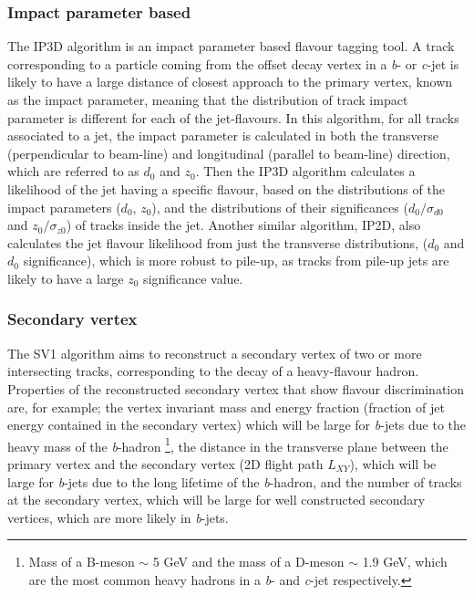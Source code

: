    \subsubsection{Impact parameter based}
   \label{sec:obj-bjets_IP}
 
   The IP3D algorithm is an impact parameter based flavour tagging tool. 
   A track corresponding to a particle coming from the offset decay vertex in a \textit{b}- or \textit{c}-jet is likely to have a large distance of 
   closest approach to the primary vertex, known as the impact parameter, meaning that the distribution of track impact parameter is different for each of the jet-flavours.
   In this algorithm, for all tracks associated to a jet, the impact parameter is calculated in both the transverse (perpendicular to beam-line)
   and longitudinal (parallel to beam-line) direction, which are referred to as $d_{0}$ and $z_{0}$.
   Then the IP3D algorithm calculates a likelihood of the jet having a specific flavour, 
   based on the distributions of the impact parameters ($d_{0}$, $z_{0}$), and the distributions of their significances 
   ($d_{0}/\sigma _{d0}$ and  $z_{0}/\sigma_{z0}$) of tracks inside the jet. 
   Another similar algorithm, IP2D, also calculates the jet flavour likelihood from just the transverse distributions, ($d_{0}$ and $d_{0}$ significance), which is more
   robust to pile-up, as tracks from pile-up jets are likely to have a large $z_{0}$ significance value.
   
   \subsubsection{Secondary vertex}
   \label{sec:obj-bjets_SV}

   
   The SV1 algorithm aims to reconstruct a secondary vertex of two or more intersecting tracks, corresponding to the decay of a heavy-flavour hadron. 
   Properties of the reconstructed secondary vertex that show flavour discrimination are, for example; the vertex 
   invariant mass and energy fraction (fraction of jet energy contained in the secondary vertex) which will be large for 
   \textit{b}-jets due to the heavy mass of the \textit{b}-hadron 
   \footnote{Mass of a B-meson $\sim$ 5 GeV and the mass of a D-meson $\sim$ 1.9 GeV, which are the most common heavy hadrons in a \textit{b}- and \textit{c}-jet respectively.}, 
   the distance in the transverse plane between the 
   primary vertex and the secondary vertex (2D flight path $L_{XY}$), which will be large for \textit{b}-jets due to the long lifetime of the \textit{b}-hadron,
   and the number of tracks at the secondary vertex, which will be large for well constructed secondary vertices, which are more likely in \textit{b}-jets.
   
